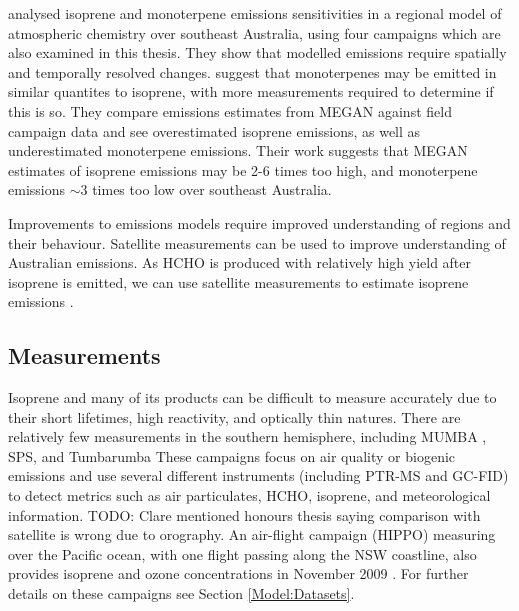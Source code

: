     \textcite{Emmerson2016} %
    analysed isoprene and monoterpene emissions sensitivities in a regional model of atmospheric chemistry over southeast Australia, using four campaigns which are also examined in this thesis.
    They show that modelled emissions require spatially and temporally resolved changes.
    \textcite{Emmerson2016} suggest that monoterpenes may be emitted in similar quantites to isoprene, with more measurements required to determine if this is so.
    They compare emissions estimates from MEGAN against field campaign data and see overestimated isoprene emissions, as well as underestimated monoterpene emissions.
    Their work suggests that MEGAN estimates of isoprene emissions may be 2-6 times too high, and monoterpene emissions $\sim3$ times too low over southeast Australia.
    
    
    Improvements to emissions models require improved understanding of regions and their behaviour.
    Satellite measurements can be used to improve understanding of Australian emissions.
    As HCHO is produced with relatively high yield after isoprene is emitted, we can use satellite measurements to estimate isoprene emissions \parencite[e.g.]{Palmer2001, Millet2006, Bauwens2016}.
    
  
  \subsection{Measurements}
    
    Isoprene and many of its products can be difficult to measure accurately due to their short lifetimes, high reactivity, and optically thin natures.
    There are relatively few measurements in the southern hemisphere, including MUMBA \parencite{PatonWalsh2013}, SPS\parencite{Dunne2018}, and Tumbarumba \parencite{Emmerson2016}
    These campaigns focus on air quality or biogenic emissions and use several different instruments (including PTR-MS and GC-FID) to detect metrics such as air particulates, HCHO, isoprene, and meteorological information.
    TODO: Clare mentioned honours thesis saying comparison with satellite is wrong due to orography.
    An air-flight campaign (HIPPO) measuring over the Pacific ocean, with one flight passing along the NSW coastline, also provides isoprene and ozone concentrations in November 2009 \parencite{Wolfsy2011}.
    For further details on these campaigns see Section \ref{Model:Datasets}.
    
